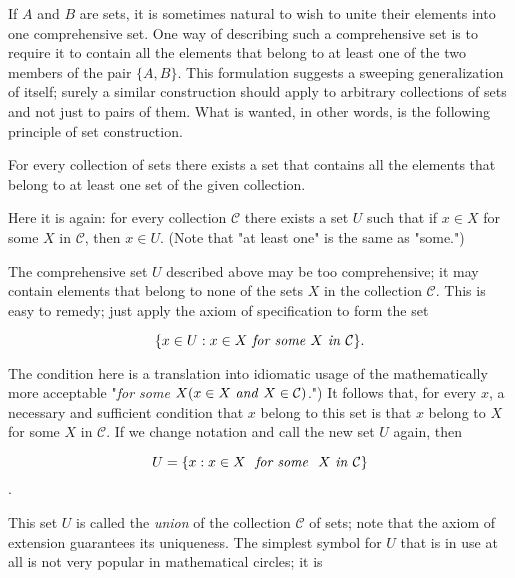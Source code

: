 
If $A$ and $B$ are sets, it is sometimes natural to wish to unite their elements into one comprehensive set. One way of describing such a comprehensive set is to require it to contain all the elements that belong to at least one of the two members of the pair $ \{ A, B \}$. This formulation suggests a sweeping  generalization of itself; surely a similar construction should apply to arbitrary collections of sets and not just to pairs of them. What is wanted, in other words, is the following principle of set construction.

\begin{named}  For every collection of sets there exists a set that contains all the elements that belong to at least one set of the given collection.
\end{named}

Here it is again: for every collection $\mathcal{C}$ there exists a set $U$ such that if $x \in X$ for some $X$ in $\mathcal{C}$, then $ x \in U$. (Note that "at least one" is the same as "some.") 

The comprehensive set $U$ described above may be too comprehensive; it may contain elements that belong to none of the sets $X$ in the collection $\mathcal{C}$. This is easy to remedy; just apply the axiom of specification to form the set 

\begin{equation*}
\{ x \in U: x \in X \text{ \textit{for some} } X \text{ \textit{in} } \mathcal{C} \}.
\end{equation*}

The condition here is a translation into idiomatic usage of the mathematically more acceptable "\textit{for some} $X(x \in X \text{ \textit{and} } X \in \mathcal{C})$.") It follows that, for every $x$, a necessary and sufficient condition that $x$ belong to this set is that $x$ belong to $X$ for some $X$ in $\mathcal{C}$. If we change notation and call the new set $U$ again, then

\begin{equation*}
U = \{ x: x \in X \text{ \textit{ for some } } X \text{ \textit{in} }  \mathcal{C} \}
\end{equation*}.

This set $U$ is called the \textit{union} of the collection $\mathcal{C}$ of sets; note that the axiom of extension guarantees its uniqueness. The simplest symbol for $U$ that is in use at all is not very popular in mathematical circles; it is 

